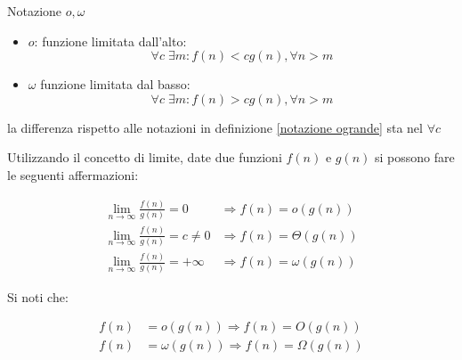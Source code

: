 \begin{definizione}{Notazione $ o, \omega  $}
	\begin{itemize}
		\item $ o $: funzione limitata dall'alto:
		      \[
			      \forall c \; \exists m : f\left(n\right) < c g\left(n\right),  \forall n > m
		      \]
		\item $ \omega  $ funzione limitata dal basso:
		      \[
			      \forall c \; \exists m : f\left(n\right) > c g\left(n\right),  \forall n > m
		      \]
	\end{itemize}
	la differenza rispetto alle notazioni in definizione \ref{notazione ogrande} sta nel $ \forall c $
\end{definizione}


Utilizzando il concetto di limite, date due funzioni $f(n)$ e $g(n)$ si possono fare le seguenti affermazioni:

\[
	\begin{aligned}
		\lim _{n \rightarrow \infty} \frac{f(n)}{g(n)}=0        & \Rightarrow f(n)=o(g(n))      \\
		\lim _{n \rightarrow \infty} \frac{f(n)}{g(n)}=c \neq 0 & \Rightarrow f(n)=\Theta(g(n)) \\
		\lim _{n \rightarrow \infty} \frac{f(n)}{g(n)}=+\infty  & \Rightarrow f(n)=\omega(g(n))
	\end{aligned}
\]


Si noti che:

\begin{align*}
	f(n) & =o(g(n)) \Rightarrow f(n)=O(g(n))             \\
	f(n) & =\omega(g(n))   \Rightarrow f(n)=\Omega(g(n))
\end{align*}


